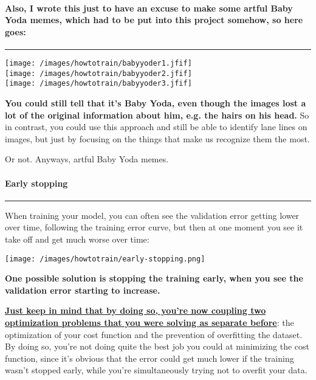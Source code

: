 \documentclass[
]{article}
\begin{document}
\hypertarget{header-n136}{%
\paragraph{\texorpdfstring{\textbf{Also, I wrote this just to have an
excuse to make some artful Baby Yoda memes, which had to be put into
this project somehow, so here
goes:}}{Also, I wrote this just to have an excuse to make some artful Baby Yoda memes, which had to be put into this project somehow, so here goes:}}\label{header-n136}}

\begin{center}\rule{0.5\linewidth}{0.5pt}\end{center}

\texttt{[image: /images/howtotrain/babyyoder1.jfif]}\\
\texttt{[image: /images/howtotrain/babyyoder2.jfif]}\\
\texttt{[image: /images/howtotrain/babyyoder3.jfif]}

\textbf{You could still tell that it's Baby Yoda, even though the images
lost a lot of the original information about him, e.g. the hairs on his
head.} So in contrast, you could use this approach and still be able to
identify lane lines on images, but just by focusing on the things that
make us recognize them the most.

Or not. Anyways, artful Baby Yoda memes.

\hypertarget{header-n141}{%
\paragraph{\texorpdfstring{\textbf{Early
stopping}}{Early stopping}}\label{header-n141}}

\begin{center}\rule{0.5\linewidth}{0.5pt}\end{center}

When training your model, you can often see the validation error getting
lower over time, following the training error curve, but then at one
moment you see it take off and get much worse over time:

\texttt{[image: /images/howtotrain/early-stopping.png]}

\textbf{One possible solution is stopping the training early, when you
see the validation error starting to increase.}

\textbf{\underline{Just keep in mind that by doing so, you're now
coupling two optimization problems that you were solving as separate
before}}: the optimization of your cost function and the prevention of
overfitting the dataset. By doing so, you're not doing quite the best
job you could at minimizing the cost function, since it's obvious that
the error could get much lower if the training wasn't stopped early,
while you're simultaneously trying not to overfit your data.
\end{document}
